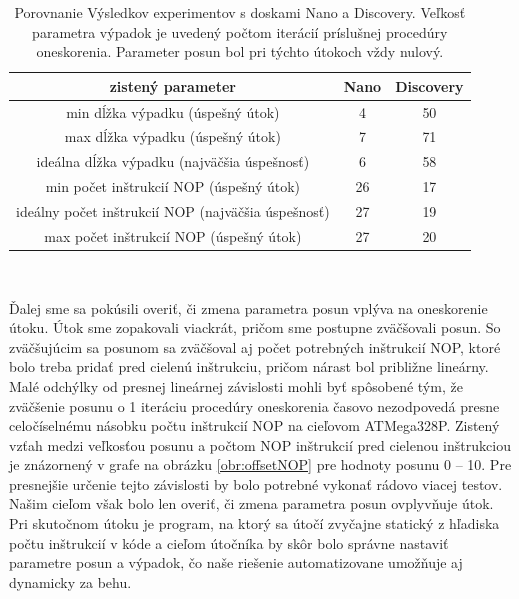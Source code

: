 \begin{table}
    \caption[Porovnanie Výsledkov experimentov]{Porovnanie Výsledkov experimentov s doskami Nano a Discovery. Veľkosť parametra výpadok je uvedený počtom iterácií príslušnej procedúry oneskorenia. Parameter posun bol pri týchto útokoch vždy nulový.}
    \label{tab:experiments}
    \begin{center}
    \begin{tabular}{|c|c|c|}
        \hline
        zistený parameter & Nano & Discovery \\
        \hline
        min dĺžka výpadku (úspešný útok) & 4 & 50 \\
        \hline
        max dĺžka výpadku (úspešný útok) & 7 & 71 \\
        \hline
        ideálna dĺžka výpadku (najväčšia úspešnosť) & 6 & 58 \\
        \hline
        min počet inštrukcií NOP (úspešný útok) & 26 & 17 \\
        \hline
        ideálny počet inštrukcií NOP (najväčšia úspešnosť) & 27 & 19 \\
        \hline
        max počet inštrukcií NOP (úspešný útok) & 27 & 20 \\
        \hline
    \end{tabular}\\[6pt]
    \end{center}
\end{table}

Ďalej sme sa pokúsili overiť, či zmena parametra posun vplýva na oneskorenie útoku. Útok sme zopakovali viackrát, pričom sme postupne zväčšovali posun. So zväčšujúcim sa posunom sa zväčšoval aj počet potrebných inštrukcií NOP, ktoré bolo treba pridať pred cielenú inštrukciu, pričom nárast bol približne lineárny. Malé odchýlky od presnej lineárnej závislosti mohli byť spôsobené tým, že zväčšenie posunu o 1 iteráciu procedúry oneskorenia časovo nezodpovedá presne celočíselnému násobku počtu inštrukcií NOP na cieľovom ATMega328P. Zistený vzťah medzi veľkosťou posunu a počtom NOP inštrukcií pred cielenou inštrukciou je znázornený v grafe na obrázku \ref{obr:offsetNOP} pre hodnoty posunu 0 -- 10. Pre presnejšie určenie tejto závislosti by bolo potrebné vykonať rádovo viacej testov. Našim cieľom však bolo len overiť, či zmena parametra posun ovplyvňuje útok. Pri skutočnom útoku je program, na ktorý sa útočí zvyčajne statický z hľadiska počtu inštrukcií v kóde a cieľom útočníka by skôr bolo správne nastaviť parametre posun a výpadok, čo naše riešenie automatizovane umožňuje aj dynamicky za behu.


